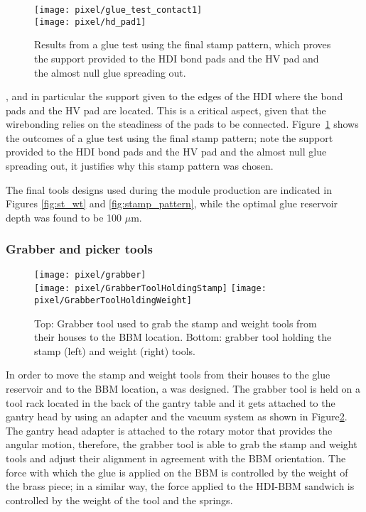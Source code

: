 \begin{figure}[!h]
  \centering  
  \texttt{[image: pixel/glue\_test\_contact1]}\\
  \texttt{[image: pixel/hd\_pad1]}
  \caption[Glue contact area test.]{Results from a glue test using the final stamp pattern, which proves the support provided to the HDI bond pads and the HV pad and the almost null glue spreading out.}\label{fig:glue_test}
\end{figure}

\item {}, and in particular the support given to the edges of the HDI where the bond pads and the HV pad are located. This is a critical aspect, given that the wirebonding relies on the steadiness of the pads to be connected. Figure~\ref{fig:glue_test} shows the outcomes of a glue test using the final stamp pattern; note the support provided to the HDI bond pads and the HV pad and the almost null glue spreading out, it justifies why this stamp pattern was chosen.   
\eit

The final tools designs used during the module production are indicated in Figures \ref{fig:st_wt} and \ref{fig:stamp_pattern}, while the optimal glue reservoir depth was found to be 100 $\mu$m. 

\subsubsection*{Grabber and picker tools}

\begin{figure}[!h]
  \centering  
  \texttt{[image: pixel/grabber]}\\
  \texttt{[image: pixel/GrabberToolHoldingStamp]}
  \texttt{[image: pixel/GrabberToolHoldingWeight]}
  \caption[Grabber tool.]{Top: Grabber tool used to grab the stamp and weight tools from their houses to the BBM location. Bottom: grabber tool holding the stamp (left) and weight (right) tools.}\label{fig:grabber_tool}
\end{figure}

In order to move the stamp and weight tools from their houses to the glue reservoir and to the BBM location, a  was designed. The grabber tool is held on a tool rack located in the back of the gantry table and it gets attached to the gantry head by using an adapter and the vacuum system as shown in Figure\ref{fig:grabber_tool}. The gantry head adapter is attached to the rotary motor that provides the angular motion, therefore, the grabber tool is able to grab the stamp and weight tools and adjust their alignment in agreement with the BBM orientation. The force with which the glue is applied on the BBM is controlled by the weight of the brass piece; in a similar way, the force applied to the HDI-BBM sandwich is controlled by the weight of the tool and the springs.                  

